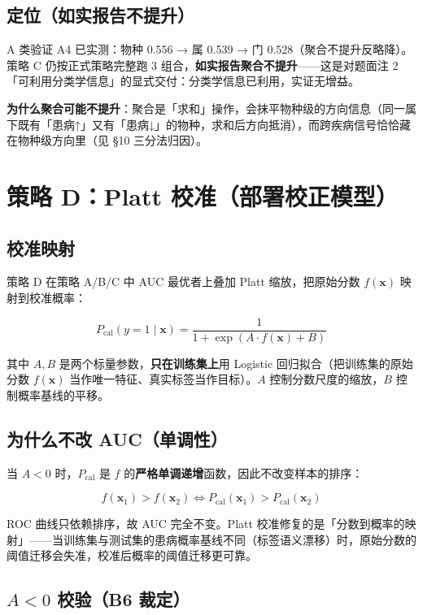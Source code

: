 \documentclass{internal-report}
\begin{document}
\subsection{定位（如实报告不提升）}

A 类验证 A4 已实测：物种 0.556 → 属 0.539 → 门 0.528（聚合不提升反略降）。策略 C 仍按正式策略完整跑 3 组合，\textbf{如实报告聚合不提升}——这是对题面注 2「可利用分类学信息」的显式交付：分类学信息已利用，实证无增益。

\textbf{为什么聚合可能不提升}：聚合是「求和」操作，会抹平物种级的方向信息（同一属下既有「患病↑」又有「患病↓」的物种，求和后方向抵消），而跨疾病信号恰恰藏在物种级方向里（见 §10 三分法归因）。

\section{策略 D：Platt 校准（部署校正模型）}

\subsection{校准映射}

策略 D 在策略 A/B/C 中 AUC 最优者上叠加 Platt 缩放，把原始分数 $f(\mathbf{x})$ 映射到校准概率：

$$
P_{\text{cal}}(y=1 \mid \mathbf{x}) = \frac{1}{1+\exp\!\left(A\cdot f(\mathbf{x}) + B\right)}
$$

其中 $A,B$ 是两个标量参数，\textbf{只在训练集上}用 Logistic 回归拟合（把训练集的原始分数 $f(\mathbf{x})$ 当作唯一特征、真实标签当作目标）。$A$ 控制分数尺度的缩放，$B$ 控制概率基线的平移。

\subsection{为什么不改 AUC（单调性）}

当 $A<0$ 时，$P_{\text{cal}}$ 是 $f$ 的\textbf{严格单调递增}函数，因此不改变样本的排序：

$$
f(\mathbf{x}_1) > f(\mathbf{x}_2) \iff P_{\text{cal}}(\mathbf{x}_1) > P_{\text{cal}}(\mathbf{x}_2)
$$

ROC 曲线只依赖排序，故 AUC 完全不变。Platt 校准修复的是「分数到概率的映射」——当训练集与测试集的患病概率基线不同（标签语义漂移）时，原始分数的阈值迁移会失准，校准后概率的阈值迁移更可靠。

\subsection{$A<0$ 校验（B6 裁定）}
\end{document}
